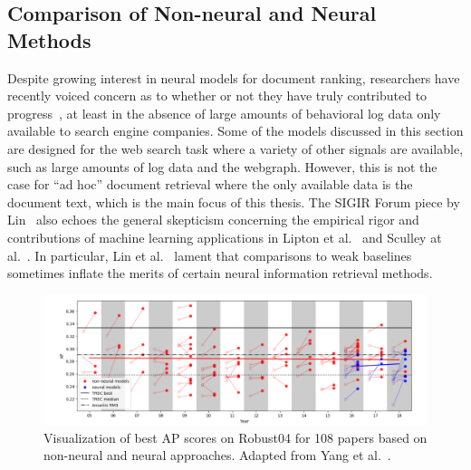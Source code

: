 \subsection{Comparison of Non-neural and Neural Methods}

Despite growing interest in neural models for document ranking, researchers have recently voiced concern as to whether or not they have truly contributed to progress~\cite{lin2019neural}, at least in the absence of large amounts of behavioral log data only available to search engine companies.
Some of the models discussed in this section are designed for the web search task where a variety of other signals are available, such as large amounts of log data and the webgraph.
However, this is not the case for ``ad hoc'' document retrieval where the only available data is the document text, which is the main focus of this thesis.
The SIGIR Forum piece by Lin~\cite{lin2019neural} also echoes the general skepticism concerning the empirical rigor and contributions of machine learning applications in Lipton et al.~\cite{lipton2018troubling} and Sculley at al.~\cite{sculley2018winner}.
In particular, Lin et al.~\cite{lin2019neural} lament that comparisons to weak baselines sometimes inflate the merits of certain neural information retrieval methods.

\begin{figure}[b!]
\centering
  \includegraphics[width=6.5in]{neural_robust04.png}
\caption{Visualization of best AP scores on Robust04 for 108 papers based on non-neural and neural approaches. Adapted from Yang et al.~\cite{Yang_etal_SIGIR2019}.}
\label{fig:neural_robust04}
\end{figure}

